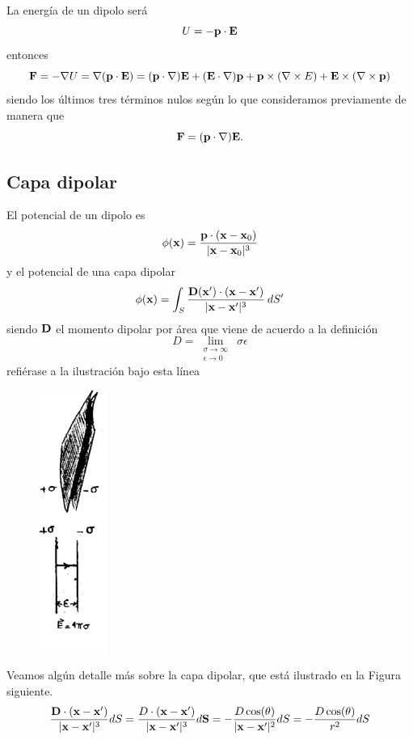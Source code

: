 \documentclass[10pt,oneside]{CBFT_book}
\begin{document}
La energía de un dipolo será
\[
	U = -\vb{p}\cdot\vb{E}
\]
entonces
\[
	\vb{F} = -\Nabla U = \Nabla(\vb{p}\cdot\vb{E}) = (\vb{p}\cdot\Nabla)\vb{E} + (\vb{E}\cdot\Nabla)\vb{p}
	+ \vb{p}\times(\rotorm{E}) + \vb{E}\times(\Nabla\times\vb{p})
\]
siendo los últimos tres términos nulos según lo que consideramos previamente de manera que
\[
	\vb{F} = (\vb{p}\cdot\Nabla)\vb{E}.
\]

\subsection{Capa dipolar}

El potencial de un dipolo es
\[
	\phi(\vb{x}) = \frac{ \vb{p}\cdot(\vb{x}-\vb{x}_0) }{|\vb{x} - \vb{x}_0|^3} 
\]
y el potencial de una capa dipolar
\[
	\phi(\vb{x}) = \int_S \frac{ \vb{D}(\vb{x}')\cdot(\vb{x}-\vb{x}') }{|\vb{x} - \vb{x}'|^3} \: dS'
\]
siendo $\vb{D}$ el momento dipolar por área que viene de acuerdo a la definición
\[
	D = \lim_{\substack{\sigma\to\infty \\ \epsilon\to 0}} \: \sigma\epsilon
\]
refiérase a la ilustración bajo esta línea
\begin{figure}[htb]
	\begin{center}
	\includegraphics[width=0.2\textwidth]{images/fig_ft1_campo_dipolar3.pdf}	 
	\end{center}
	\caption{}
\end{figure}

Veamos algún detalle más sobre la capa dipolar, que está ilustrado en la Figura siguiente.
\[
	\frac{ \vb{D}\cdot(\vb{x}-\vb{x}')}{|\vb{x} - \vb{x}'|^3} dS = 
	\frac{ D \cdot(\vb{x}-\vb{x}')}{|\vb{x} - \vb{x}'|^3} d\vb{S} = 
	- \frac{ D \cos(\theta)}{|\vb{x} - \vb{x}'|^2} dS = 
	- \frac{ D \cos(\theta)}{r^2} dS  
\]
\end{document}
